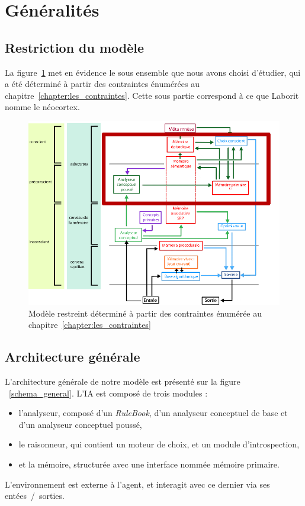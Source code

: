 \section{Généralités}

\subsection{Restriction du modèle}

La figure~\ref{modele_restreint} met en évidence le sous ensemble que nous avons choisi d'étudier, qui a été déterminé à partir des contraintes énumérées au chapitre~\ref{chapter:les_contraintes}. Cette sous partie correspond à ce que Laborit nomme le néocortex.

\begin{figure}[H] 
\includegraphics[width=\textwidth]{files/modele_restreint} 
\caption{Modèle restreint déterminé à partir des contraintes énumérée au chapitre~\ref{chapter:les_contraintes}} 
\label{modele_restreint}
\end{figure}

\subsection{Architecture générale}

L'architecture générale de notre modèle est présenté sur la figure ~\ref{schema_general}. L'IA est composé de trois modules :
\begin{itemize}
\item l'analyseur, composé d'un \emph{RuleBook}, d'un analyseur conceptuel de base et d'un analyseur conceptuel poussé,
\item le raisonneur, qui contient un moteur de choix, et un module d'introspection,
\item et la mémoire, structurée avec une interface nommée mémoire primaire.
\end{itemize}
L'environnement est externe à l'agent, et interagit avec ce dernier via ses entées~/~sorties.

